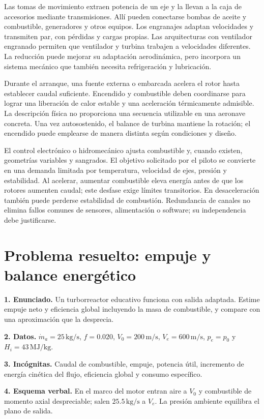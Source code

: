Las tomas de movimiento extraen potencia de un eje y la llevan a la caja de accesorios mediante transmisiones. Allí pueden conectarse bombas de aceite y combustible, generadores y otros equipos. Los engranajes adaptan velocidades y transmiten par, con pérdidas y cargas propias. Las arquitecturas con ventilador engranado permiten que ventilador y turbina trabajen a velocidades diferentes. La reducción puede mejorar su adaptación aerodinámica, pero incorpora un sistema mecánico que también necesita refrigeración y lubricación.

Durante el arranque, una fuente externa o embarcada acelera el rotor hasta establecer caudal suficiente. Encendido y combustible deben coordinarse para lograr una liberación de calor estable y una aceleración térmicamente admisible. La descripción física no proporciona una secuencia utilizable en una aeronave concreta. Una vez autosostenido, el balance de turbina mantiene la rotación; el encendido puede emplearse de manera distinta según condiciones y diseño.

El control electrónico o hidromecánico ajusta combustible y, cuando existen, geometrías variables y sangrados. El objetivo solicitado por el piloto se convierte en una demanda limitada por temperatura, velocidad de ejes, presión y estabilidad. Al acelerar, aumentar combustible eleva energía antes de que los rotores aumenten caudal; este desfase exige límites transitorios. En desaceleración también puede perderse estabilidad de combustión. Redundancia de canales no elimina fallos comunes de sensores, alimentación o software; su independencia debe justificarse.

\section{Problema resuelto: empuje y balance energético}
\textbf{1. Enunciado.} Un turborreactor educativo funciona con salida adaptada. Estime empuje neto y eficiencia global incluyendo la masa de combustible, y compare con una aproximación que la desprecia.

\textbf{2. Datos.} $\dot m_a=25\,\mathrm{kg/s}$, $f=0.020$, $V_0=200\,\mathrm{m/s}$, $V_e=600\,\mathrm{m/s}$, $p_e=p_0$ y $H_i=43\,\mathrm{MJ/kg}$.

\textbf{3. Incógnitas.} Caudal de combustible, empuje, potencia útil, incremento de energía cinética del flujo, eficiencia global y consumo específico.

\textbf{4. Esquema verbal.} En el marco del motor entran aire a $V_0$ y combustible de momento axial despreciable; salen $25.5\,\mathrm{kg/s}$ a $V_e$. La presión ambiente equilibra el plano de salida.

